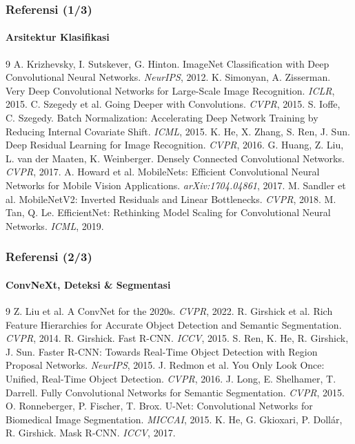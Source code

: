 \documentclass[t,aspectratio=169,xcolor=dvipsnames]{beamer}
\begin{document}
\begin{frame}
    \frametitle{Referensi (1/3)}
    \framesubtitle{Arsitektur Klasifikasi}
    \scriptsize
    \begin{thebibliography}{9}
         A. Krizhevsky, I. Sutskever, G. Hinton. ImageNet Classification with Deep Convolutional Neural Networks. \textit{NeurIPS}, 2012.
         K. Simonyan, A. Zisserman. Very Deep Convolutional Networks for Large-Scale Image Recognition. \textit{ICLR}, 2015.
         C. Szegedy et al. Going Deeper with Convolutions. \textit{CVPR}, 2015.
         S. Ioffe, C. Szegedy. Batch Normalization: Accelerating Deep Network Training by Reducing Internal Covariate Shift. \textit{ICML}, 2015.
         K. He, X. Zhang, S. Ren, J. Sun. Deep Residual Learning for Image Recognition. \textit{CVPR}, 2016.
         G. Huang, Z. Liu, L. van der Maaten, K. Weinberger. Densely Connected Convolutional Networks. \textit{CVPR}, 2017.
         A. Howard et al. MobileNets: Efficient Convolutional Neural Networks for Mobile Vision Applications. \textit{arXiv:1704.04861}, 2017.
         M. Sandler et al. MobileNetV2: Inverted Residuals and Linear Bottlenecks. \textit{CVPR}, 2018.
         M. Tan, Q. Le. EfficientNet: Rethinking Model Scaling for Convolutional Neural Networks. \textit{ICML}, 2019.
    \end{thebibliography}
\end{frame}

\begin{frame}
    \frametitle{Referensi (2/3)}
    \framesubtitle{ConvNeXt, Deteksi \& Segmentasi}
    \scriptsize
    \begin{thebibliography}{9}
         Z. Liu et al. A ConvNet for the 2020s. \textit{CVPR}, 2022.
         R. Girshick et al. Rich Feature Hierarchies for Accurate Object Detection and Semantic Segmentation. \textit{CVPR}, 2014.
         R. Girshick. Fast R-CNN. \textit{ICCV}, 2015.
         S. Ren, K. He, R. Girshick, J. Sun. Faster R-CNN: Towards Real-Time Object Detection with Region Proposal Networks. \textit{NeurIPS}, 2015.
         J. Redmon et al. You Only Look Once: Unified, Real-Time Object Detection. \textit{CVPR}, 2016.
         J. Long, E. Shelhamer, T. Darrell. Fully Convolutional Networks for Semantic Segmentation. \textit{CVPR}, 2015.
         O. Ronneberger, P. Fischer, T. Brox. U-Net: Convolutional Networks for Biomedical Image Segmentation. \textit{MICCAI}, 2015.
         K. He, G. Gkioxari, P. Dollár, R. Girshick. Mask R-CNN. \textit{ICCV}, 2017.
    \end{thebibliography}
\end{frame}
\end{document}
